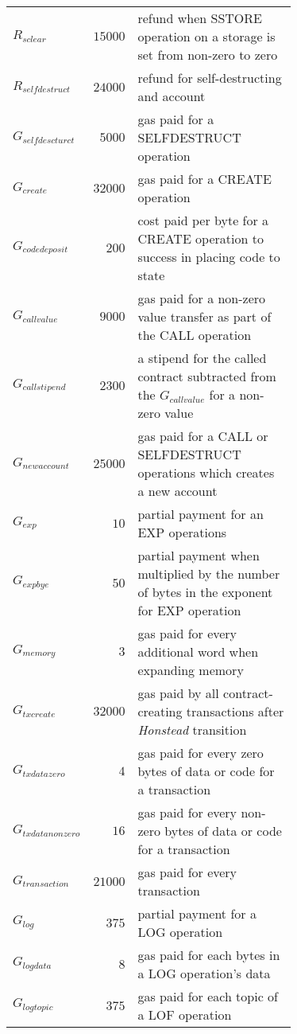\documentclass{article}
\begin{document}
\begin{itemize}
\begin{table}
\begin{center}
\begin{tabular}{l r p{0.71\linewidth}}
                    $R_{sclear}$ & $15000$ & refund when SSTORE operation on a storage is set from non-zero to zero \\
                    $R_{selfdestruct}$ & $24000$ & refund for self-destructing and account \\
                    $G_{selfdescturct}$ & $5000$ & gas paid for a SELFDESTRUCT operation \\
                    $G_{create}$ & $32000$ & gas paid for a CREATE operation \\
                    $G_{codedeposit}$ & $200$ & cost paid per byte for a CREATE operation to success in placing code to state \\
                    $G_{callvalue}$ & $9000$ & gas paid for a non-zero value transfer as part of the CALL operation \\
                    $G_{callstipend}$ & $2300$ & a stipend for the called contract subtracted from the $G_{callvalue}$ for a non-zero value \\
                    $G_{newaccount}$ & $25000$ & gas paid for a CALL or SELFDESTRUCT operations which creates a new account \\
                    $G_{exp}$ & $10$ & partial  payment for an EXP operations \\
                    $G_{expbye}$ & $50$ & partial payment when multiplied by the number of bytes in the exponent for EXP operation \\
                    $G_{memory}$ & $3$ & gas paid for every additional word when expanding memory \\
                    $G_{txcreate}$ & $32000$ & gas paid by all contract-creating transactions after \textit{Honstead} transition \\
                    $G_{txdatazero}$ & $4$ & gas paid for every zero bytes of data or code for a transaction \\
                    $G_{txdatanonzero}$ & $16$ & gas paid for every non-zero bytes of data or code for a transaction \\
                    $G_{transaction}$ & $21000$ & gas paid for every transaction \\
                    $G_{log}$ & $375$ & partial payment for a LOG operation  \\
                    $G_{logdata}$ & $8$ & gas paid for each bytes in a LOG operation's data \\
                    $G_{logtopic}$ & $375$ & gas paid for each topic of a LOF operation \\

\end{tabular}
\end{center}
\end{table}
\end{itemize}
\end{document}
